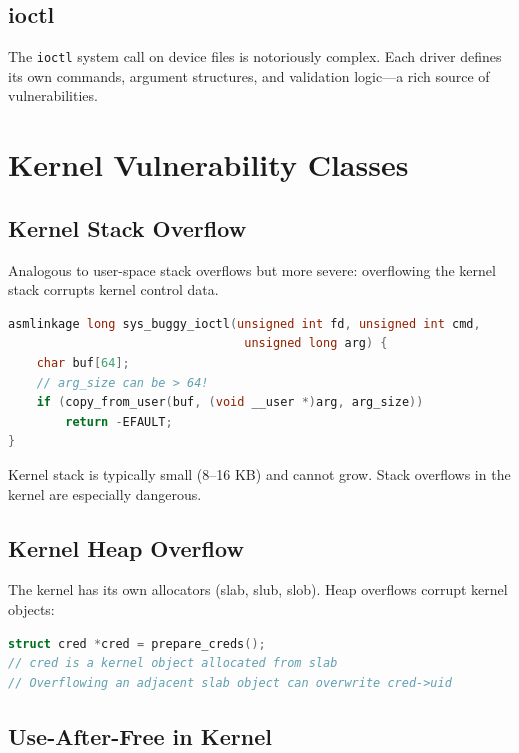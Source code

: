 \subsection{ioctl}

The \texttt{ioctl} system call on device files is notoriously complex. Each driver defines its own commands, argument structures, and validation logic---a rich source of vulnerabilities.

\section{Kernel Vulnerability Classes}

\subsection{Kernel Stack Overflow}

Analogous to user-space stack overflows but more severe: overflowing the kernel stack corrupts kernel control data.

\begin{lstlisting}[language=C, caption=Kernel stack overflow]
asmlinkage long sys_buggy_ioctl(unsigned int fd, unsigned int cmd,
                                 unsigned long arg) {
    char buf[64];
    // arg_size can be > 64!
    if (copy_from_user(buf, (void __user *)arg, arg_size))
        return -EFAULT;
}
\end{lstlisting}

Kernel stack is typically small (8--16 KB) and cannot grow. Stack overflows in the kernel are especially dangerous.

\subsection{Kernel Heap Overflow}

The kernel has its own allocators (slab, slub, slob). Heap overflows corrupt kernel objects:

\begin{lstlisting}[language=C, caption=Kernel heap overflow]
struct cred *cred = prepare_creds();
// cred is a kernel object allocated from slab
// Overflowing an adjacent slab object can overwrite cred->uid
\end{lstlisting}

\subsection{Use-After-Free in Kernel}

